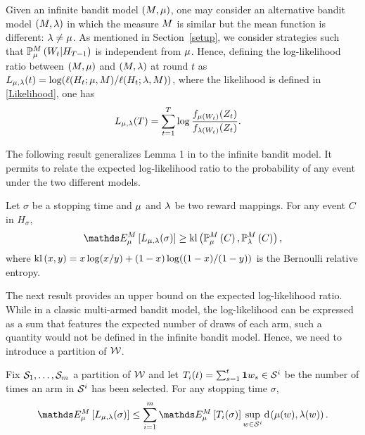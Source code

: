 Given an infinite bandit model $(M,\mu)$, one may consider an alternative
bandit model $(M,\lambda)$ in which the measure $M$ is similar but the
mean function is different: $\lambda \neq \mu$. As mentioned in
Section~\ref{setup}, we consider strategies such that
$\mathbb{P}_{\mu}^M\left(  W_t | H_{T-1}  \right)$ is independent from $\mu$. Hence, defining the log-likelihood
ratio between $(M,\mu)$ and $(M,\lambda)$ at round $t$ as
$L_{\mu,\lambda}(t) = \log(\ell(H_t ; \mu,M) / \ell(H_t; \lambda,M))$, where the likelihood is defined in 
\eqref{Likelihood}, one has 
\begin{align}
L_{\mu,\lambda}(T)
    &= \sum_{t=1}^T \log \frac{f_{\mu(W_t)}(Z_t)}{f_{\lambda(W_t)}(Z_t)}.\label{logLikelihood}
\end{align}

The following result generalizes Lemma 1 in \cite{JMLR15} to the infinite
bandit model. It permits to relate the expected log-likelihood ratio to the
probability of any event under the two different models.

\begin{lemma}\label{up-2014arXiv1407.4443K}
\label{lem-log-lik}
Let $\sigma$ be a stopping time and $\mu$ and $\lambda$ be two reward mappings.
For any event $C$ in $H_\sigma$,
\begin{align*}
\ETrueModel{ L_{\ArmMean,\ArmMeanAlt}(\sigma) }
	\ge \BernKL{\PrTrueModel{C}}{\PrAltModel{C}},
\end{align*}
where $\operatorname{kl}\left( x, y \right)=x\log(x/y) + (1-x)\log((1-x)/(1-y))$ is the Bernoulli relative
entropy.
\end{lemma}

The next result provides an upper bound on the expected log-likelihood ratio.
While in a classic multi-armed bandit model, the log-likelihood can be
expressed as a sum that features the expected number of draws of each arm, such
a quantity would not be defined in the infinite bandit model. Hence, we need to
introduce a partition of $\mathcal{W}$.

\begin{lemma}\label{main-lb-lemma}
Fix $\mathcal{S}_{1},\dots,\mathcal{S}_{m}$ a partition of $\mathcal{W}$ and let
$T_i(t) = \sum_{s=1}^t\mathbf{1}{w_s \in \mathcal{S}^{i}}$
be the number of times an arm in $\mathcal{S}^{i}$ has been selected.
For any stopping time $\sigma$,
\begin{align*}
\ETrueModel{ L_{\ArmMean,\ArmMeanAlt}(\sigma) }
\leq \sum_{i=1}^m \ETrueModel{ T_i(\sigma) } \sup_{\arm \in \ArmGrp{i}} \ArmKL{\ArmMean(\arm)}{\ArmMeanAlt(\arm)}.
\end{align*}
\end{lemma}



